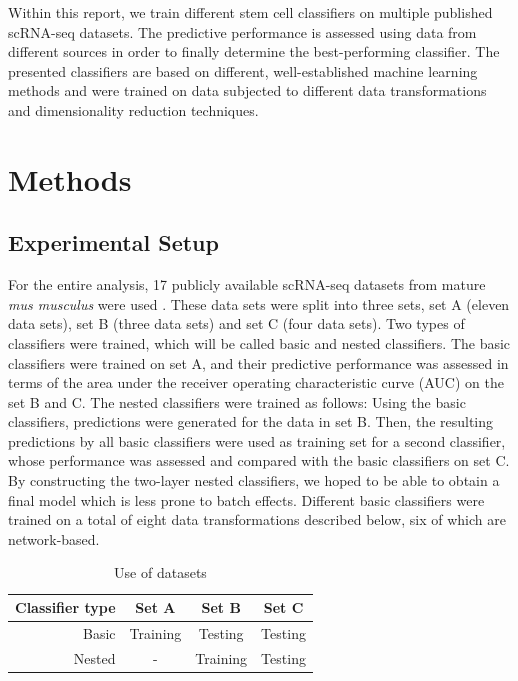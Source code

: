 \documentclass[10pt,conference,compsocconf]{IEEEtran}
\begin{document}
\par
Within this report, we train different stem cell classifiers on multiple published scRNA-seq datasets. The predictive performance is assessed using data from different sources in order to finally determine the best-performing classifier. The presented classifiers are based on different, well-established machine learning methods and were trained on data subjected to different data transformations and dimensionality reduction techniques.

\section*{Methods}
\subsection{Experimental Setup}
For the entire analysis, 17 publicly available scRNA-seq datasets from mature \textit{mus musculus} were used \cite{Campbell2017, Chen2017, Dahlin2018,Dulken2017, Gokce2016, Kowalczyk2015, Haber2017, Hochgerner2018, Rodda2018, Schwalie2018, Nestorowa2016, Park2018, Shah2018, TabulaMuris2017, Tasic2016, Zeisel2018}. These data sets were split into three sets, set A (eleven data sets), set B (three data sets) and set C (four data sets). Two types of classifiers were trained, which will be called basic and nested classifiers. The basic classifiers were trained on set A, and their predictive performance was assessed in terms of the area under the receiver operating characteristic curve (AUC) on the set B and C. The nested classifiers were trained as follows: Using the basic classifiers, predictions were generated for the data in set B. Then, the resulting predictions by all basic classifiers were used as training set for a second classifier, whose performance was assessed and compared with the basic classifiers on set C. By constructing the two-layer nested classifiers, we hoped to be able to obtain a final model which is less prone to batch effects. 
Different basic classifiers were trained on a total of eight data transformations described below, six of which are network-based. 
\begin{table}[H]
	\centering
	\begin{tabular}{|r|c|c|c|}
		\hline
		\textbf{Classifier type} & \textbf{Set A} & \textbf{Set B} & \textbf{Set C} \\ \hline
		Basic & Training & Testing & Testing \\
		Nested & - & Training & Testing \\
		\hline
	\end{tabular}
	\caption{Use of datasets}
\end{table}
\end{document}
